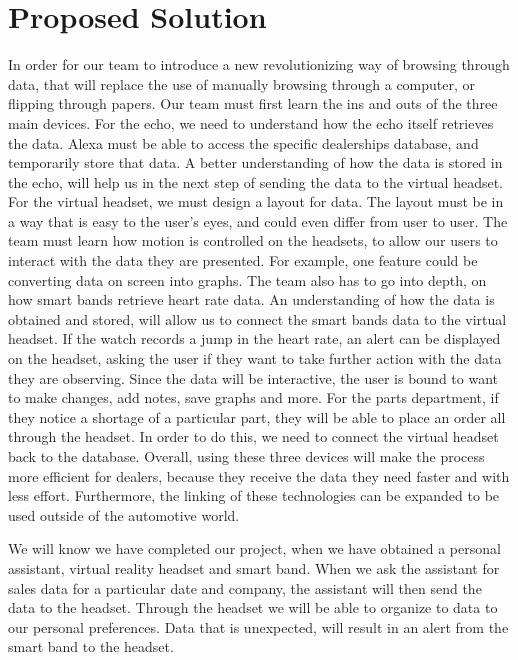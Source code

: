 \documentclass[onecolumn, draftclsnofoot,10pt, compsoc]{IEEEtran}
\begin{document}
	

\section{Proposed Solution}
	In order for our team to introduce a new revolutionizing way of browsing through data, that will replace the use of manually browsing through a computer, or flipping through papers. Our team must first learn the ins 
	and outs of the three main devices. For the echo, we need to understand how the echo itself retrieves the data. Alexa must be able to access the specific dealerships database, and temporarily store that data. A better
	understanding of how the data is stored in the echo, will help us in the next step of sending the data to the virtual headset. For the virtual headset, we must design a layout for data. The layout must be in a way that
	is easy to the user’s eyes, and could even differ from user to user. The team must learn how motion is controlled on the headsets, to allow our users to interact with the data they are presented. For example, one feature
	could be converting data on screen into graphs. The team also has to go into depth, on how smart bands retrieve heart rate data. An understanding of how the data is obtained and stored, will allow us to connect the smart 
	bands data to the virtual headset. If the watch records a jump in the heart rate, an alert can be displayed on the headset, asking the user if they want to take further action with the data they are observing. Since the
	data will be interactive, the user is bound to want to make changes, add notes, save graphs and more. For the parts department, if they notice a shortage of a particular part, they will be able to place an order all through 
	the headset. In order to do this, we need to connect the virtual headset back to the database.  Overall, using these three devices will make the process more efficient for dealers, because they receive the data they need 
	faster and with less effort. Furthermore, the linking of these technologies can be expanded to be used outside of the automotive world.
	
	We will know we have completed our project, when we have obtained a personal assistant, virtual reality headset and smart band. When we ask the assistant for sales data for a particular date and company, the assistant will
	then send the data to the headset. Through the headset we will be able to organize to data to our personal preferences. Data that is unexpected, will result in an alert from the smart band to the headset.

	
\end{document}
